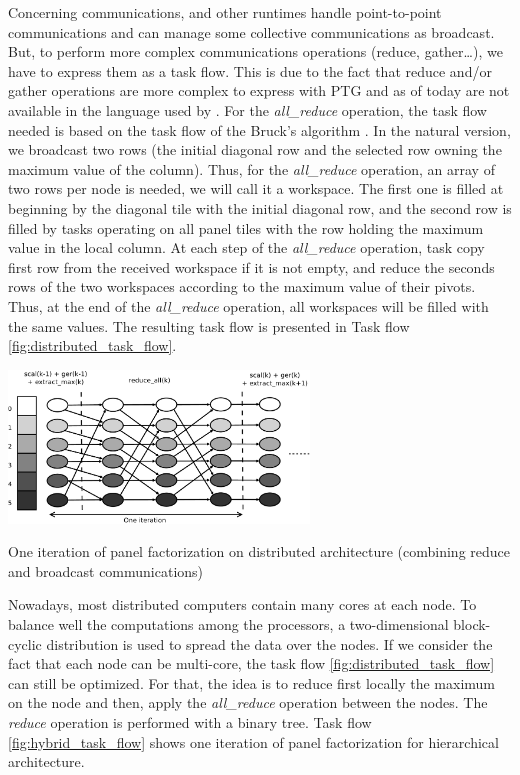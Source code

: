 Concerning communications, \dague and other runtimes handle point-to-point communications and can manage some collective communications as broadcast. But, to perform more complex communications operations (reduce, gather\dots), we have to express them as a task flow. 
This is due to the fact that reduce and/or gather operations are more complex to express with PTG and as of today are not available in the language used by \dague. For the \emph{all\_reduce} operation, the task flow needed is based on the task flow of the Bruck's algorithm \cite{BruckEtAl97}.
In the natural version, we broadcast two rows (the initial diagonal row and the selected row owning the maximum value of the column). Thus, for the \emph{all\_reduce} operation, an array of two rows per node is needed, we will call it a workspace. The first one is filled at beginning by the diagonal tile with the initial diagonal row, and the second row is filled by tasks operating on all panel tiles with the row holding the maximum value in the local column. At each step of the \textit{all\_reduce} operation, task copy first row from the received workspace if it is not empty, and reduce the seconds rows of the two workspaces according to the maximum value of their pivots. Thus, at the end of the \textit{all\_reduce} operation, all workspaces will be filled with the same values.
The resulting task flow is presented in Task flow \ref{fig:distributed_task_flow}.

\begin{taskflow}[!ht]
\centering
\includegraphics[width=0.6\textwidth]{figures/distributed_tf_bw.pdf}
\caption{One iteration of panel factorization on distributed architecture (combining reduce and broadcast communications)\label{fig:distributed_task_flow}}

\end{taskflow}

Nowadays, most distributed computers contain many cores at each node. To balance well the computations among the processors, a two-dimensional block-cyclic distribution is used to spread the data over the nodes\cite{DGW:SHPCC92}.
If we consider the fact that each node can be multi-core, the task flow \ref{fig:distributed_task_flow} can still be optimized. For that, the idea is to reduce first locally the maximum on the node and then, apply the \emph{all\_reduce} operation between the nodes. The \emph{reduce} operation is performed with a binary tree. Task flow \ref{fig:hybrid_task_flow} shows one iteration of panel factorization for hierarchical architecture. 

